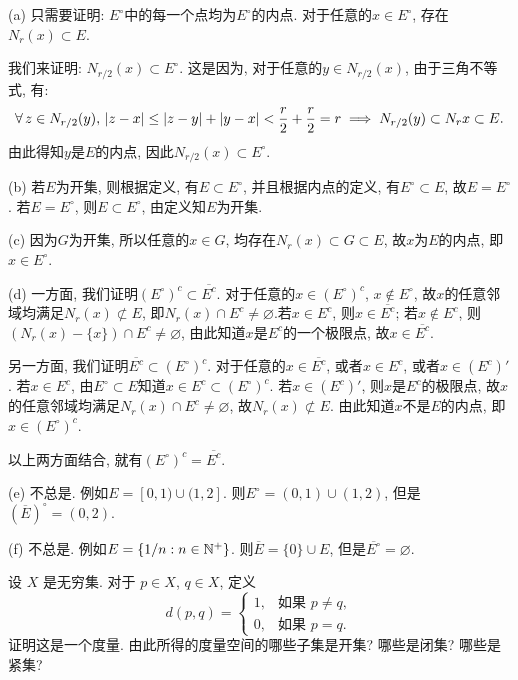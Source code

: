 \documentclass{article}
\begin{document}
\begin{solution}
    (a) 只需要证明: \( E^\circ \)中的每一个点均为\( E^\circ \)的内点. 对于任意的\( x\in E^\circ \), 存在\( N_r(x)\subset E  \). \par
    我们来证明: \( N_{r/2}(x)\subset E^\circ  \). 这是因为, 对于任意的\( y\in N_{r/2}(x) \), 由于三角不等式, 有: 
    \[ \forall\,z\in N_{r/2}(y),\,\left|z-x\right|\le\left|z-y\right|+\left|y-x\right|<\frac{r}{2}+\frac{r}{2}=r\implies N_{r/2}(y)\subset N_{r}x\subset E. \]
    由此得知\( y \)是\( E \)的内点, 因此\( N_{r/2}(x)\subset E^\circ \). \par
    (b) 若\( E \)为开集, 则根据定义, 有\( E\subset E^\circ \), 并且根据内点的定义, 有\( E^\circ\subset E  \), 故\( E=E^\circ  \). 若\( E=E^\circ \), 则\( E\subset E^\circ  \), 由定义知\( E  \)为开集.\par
    (c) 因为\( G \)为开集, 所以任意的\( x\in G \), 均存在\( N_r(x)\subset G\subset E \), 故\( x \)为\( E  \)的内点, 即\( x\in E^\circ \).\par
    (d) 一方面, 我们证明\( (E^\circ)^c\subset\overline{E^c} \). 对于任意的\( x\in(E^\circ)^c \), \( x\not\in E^\circ \), 故\( x \)的任意邻域均满足\( N_r(x)\not\subset E \), 即\( N_r(x)\cap E^c\neq\varnothing \).若\( x\in E^c \), 则\( x\in\overline{E^c } \); 若\( x\not\in E^c  \), 则\( (N_r(x)-\{x\})\cap E^c\neq\varnothing \), 由此知道\( x \)是\( E^c  \)的一个极限点, 故\( x\in\overline{E^c} \).\par
    另一方面, 我们证明\( \overline{E^c }\subset(E^\circ)^c  \). 对于任意的\( x\in\overline{E^c} \), 或者\( x\in E^c  \), 或者\( x\in(E^c)' \). 若\( x\in E^c \), 由\( E^\circ\subset E  \)知道\( x\in E^c\subset(E^\circ)^c \). 若\( x\in(E^c)' \), 则\( x \)是\( E^c \)的极限点, 故\( x \)的任意邻域均满足\( N_r(x)\cap E^c\neq\varnothing \), 故\( N_r(x)\not\subset E \). 由此知道\( x \)不是\( E \)的内点, 即\( x\in (E^\circ)^c  \). \par
    以上两方面结合, 就有\( (E^\circ)^c=\overline{E^c } \). \par
    (e) 不总是. 例如\( E=[0,1)\cup (1,2] \). 则\( E^\circ=(0,1)\cup(1,2) \), 但是\( (\overline{E })^\circ=(0,2) \). \par
    (f) 不总是. 例如\( E=\{1/n:n\in\mathbb{N}^+\} \). 则\( \overline{E}=\{0\}\cup E  \), 但是\( \overline{E^\circ}=\varnothing \).    
\end{solution}

\begin{problem}[2-10]
    设 \( X \) 是无穷集. 对于 \( p\in X \), \( q\in X \), 定义
    \[
    d(p,q)=
    \begin{cases}
        1, & \text{如果 } p\ne q,\\
        0, & \text{如果 } p=q.
    \end{cases}
    \]
    证明这是一个度量. 由此所得的度量空间的哪些子集是开集? 哪些是闭集? 哪些是紧集?
\end{problem}
\end{document}
